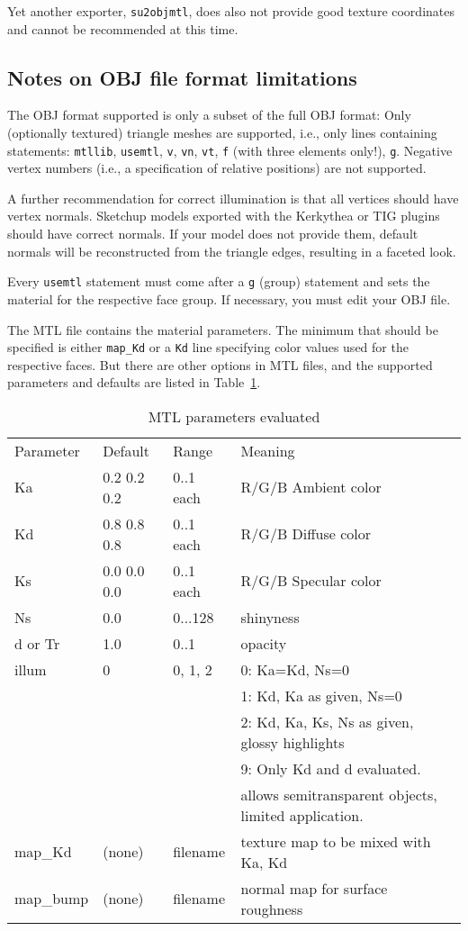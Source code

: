 \documentclass[a4paper]{article}
\newcommand{\filename}[1]{\texttt{#1}}
\newcommand{\cmd}[1]{\texttt{#1}}
\begin{document}
Yet another exporter, \filename{su2objmtl}, does also not provide good texture
coordinates and cannot be recommended at this time.

\subsection{Notes on OBJ file format limitations}
\label{sec:OBJlimitations}

The OBJ format supported is only a subset of the full OBJ format: Only
(optionally textured) triangle meshes are supported, i.e., only lines containing statements:  
\cmd{mtllib}, \cmd{usemtl}, \cmd{v}, \cmd{vn}, \cmd{vt}, \cmd{f} (with three elements only!), \cmd{g}.
Negative vertex numbers (i.e., a specification of relative positions) are not supported.

A further recommendation for correct illumination is that all vertices should  have
vertex normals. Sketchup models exported with the Kerkythea or TIG plugins
should have correct normals. If your model does not provide them, 
default normals will be reconstructed from the triangle edges, resulting in a faceted look.

Every \cmd{usemtl} statement must come after a \cmd{g} (group) statement and sets
the material for the respective face group. If necessary, you must
edit your OBJ file.

The MTL file contains the material parameters. The minimum that should be specified is 
either \cmd{map\_Kd} or a \cmd{Kd} line specifying color values used for the respective faces. But there are 
other options in MTL files, and the supported parameters and defaults are listed in Table~\ref{tab:MTL}.

\begin{table}
\begin{tabular}{llll}
Parameter&Default      &Range     & Meaning\\
Ka       &0.2 0.2 0.2  & 0..1 each& R/G/B Ambient color\\
Kd       &0.8 0.8 0.8  & 0..1 each& R/G/B Diffuse color\\
Ks       &0.0 0.0 0.0  & 0..1 each& R/G/B Specular color\\
Ns       &0.0          & 0...128  & shinyness \\
d or Tr  &1.0          & 0..1     & opacity \\
illum    &0            & 0, 1, 2  & 0: Ka=Kd, Ns=0 \\
         &             &          & 1: Kd, Ka as given, Ns=0\\
         &             &          & 2: Kd, Ka, Ks, Ns as given, glossy highlights\\
         &             &          & 9: Only Kd and d evaluated.\\
         &             &          & \hphantom{9:} allows semitransparent objects, limited application.\\
map\_Kd  & (none)      & filename & texture map to be mixed with Ka, Kd \\
map\_bump& (none)      & filename & normal map for surface roughness  
\end{tabular}
\caption{MTL parameters evaluated}
\label{tab:MTL}
\end{table}
\end{document}
